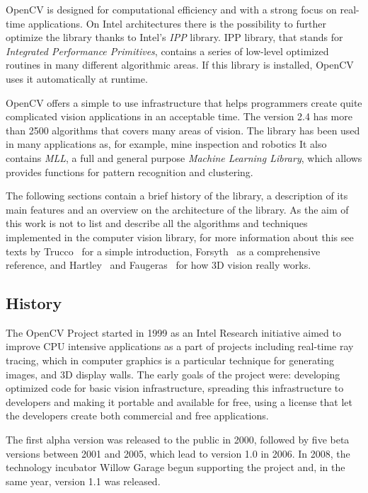 	\mbox{OpenCV} is designed for computational efficiency and with a strong focus on real-time applications. On Intel architectures there is the possibility to further optimize the library thanks to Intel's \emph{IPP} library. IPP library, that stands for \emph{Integrated Performance Primitives}, contains a series of low-level optimized routines in many different algorithmic areas. If this library is installed, \mbox{OpenCV} uses it automatically at runtime.

	\mbox{OpenCV} offers a simple to use infrastructure that helps programmers create quite complicated vision applications in an acceptable time. The version 2.4 has more than 2500 algorithms that covers many areas of vision. The library has been used in many applications as, for example, mine inspection and robotics 
	It also contains \emph{MLL}, a full and general purpose \emph{Machine Learning Library}, which allows provides functions for pattern recognition and clustering\cite{bradski2008learning}. 

	The following sections contain a brief history of the library, a description of its main features and an overview on the architecture of the library. As the aim of this work is not to list and describe all the algorithms and techniques implemented in the computer vision library, for more information about this see texts by Trucco~\cite{trucco1998introductory} for a simple introduction, Forsyth~\cite{forsyth2011computer} as a comprehensive reference, and Hartley~\cite{hartley2003multiple} and Faugeras~\cite{faugeras1993three} for how 3D vision really works.




	
	\subsection{History}
	The \mbox{OpenCV} Project started in 1999 as an Intel Research initiative aimed to improve CPU intensive applications as a part of projects including real-time ray tracing, which in computer graphics is a particular technique for generating images, and 3D display walls. The early goals of the project were: developing optimized code for basic vision infrastructure, spreading this infrastructure to developers and making it portable and available for free, using a license that let the developers create both commercial and free applications.

	The first alpha version was released to the public in 2000, followed by five beta versions between 2001 and 2005, which lead to version 1.0 in 2006. In 2008, the technology incubator Willow Garage begun supporting the project and, in the same year, version 1.1  was released.

